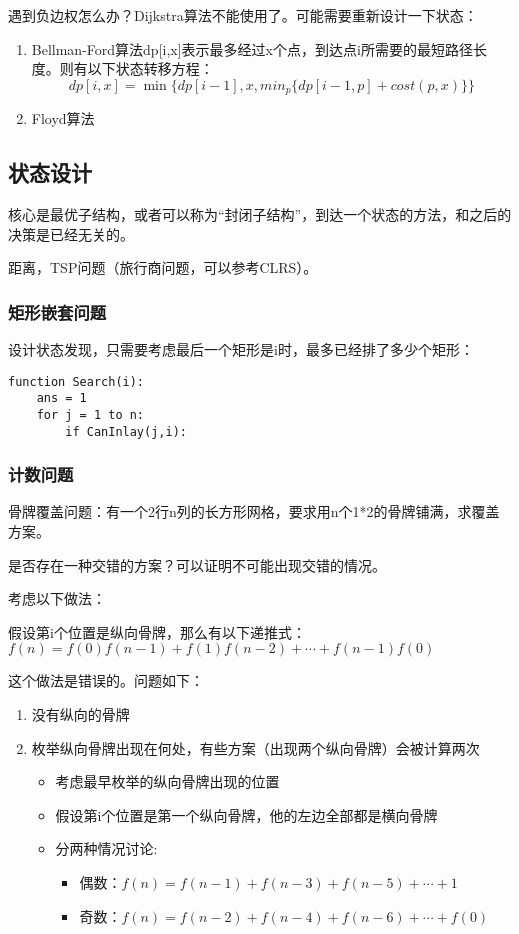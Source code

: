 \documentclass{article}
\begin{document}
遇到负边权怎么办？Dijkstra算法不能使用了。可能需要重新设计一下状态：
\begin{enumerate}
\item{Bellman-Ford算法}dp[i,x]表示最多经过x个点，到达点i所需要的最短路径长度。则有以下状态转移方程：
\begin{equation*}
dp[i,x]=\min\{dp[i-1],x,min_p\{dp[i-1,p]+cost(p,x)\}\}
\end{equation*}
\item{Floyd算法}
\end{enumerate}
\subsection{状态设计}
核心是最优子结构，或者可以称为“封闭子结构”，到达一个状态的方法，和之后的决策是已经无关的。

距离，TSP问题（旅行商问题，可以参考CLRS）。
\subsubsection{矩形嵌套问题}
设计状态发现，只需要考虑最后一个矩形是i时，最多已经排了多少个矩形：
\begin{verbatim}
function Search(i):
    ans = 1
    for j = 1 to n:
        if CanInlay(j,i):
\end{verbatim}
\subsubsection{计数问题}
骨牌覆盖问题：有一个2行n列的长方形网格，要求用n个1*2的骨牌铺满，求覆盖方案。

是否存在一种交错的方案？可以证明不可能出现交错的情况。

考虑以下做法：

假设第i个位置是纵向骨牌，那么有以下递推式：
$f(n)=f(0)f(n-1)+f(1)f(n-2)+\cdots+f(n-1)f(0)$

这个做法是错误的。问题如下：
\begin{enumerate}
  \item{没有纵向的骨牌}
  \item{枚举纵向骨牌出现在何处，有些方案（出现两个纵向骨牌）会被计算两次}
  \begin{itemize}
    \item{考虑最早枚举的纵向骨牌出现的位置}
    \item{假设第i个位置是第一个纵向骨牌，他的左边全部都是横向骨牌}
    \item{分两种情况讨论:}
    \begin{itemize}
      \item{偶数：$f(n)=f(n-1)+f(n-3)+f(n-5)+\cdots+1$}
      \item{奇数：$f(n)=f(n-2)+f(n-4)+f(n-6)+\cdots+f(0)$}
    \end{itemize}
  \end{itemize}
\end{enumerate}
\end{document}

